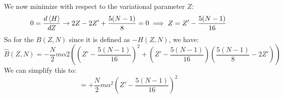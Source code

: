 \documentclass{article}[16pt]
\begin{document}
We now minimize with respect to the variational parameter $Z$:
\begin{equation}
    0 = \frac{d\expval{H}}{dZ}\rightarrow 2Z - 2Z' + \frac{5(N-1)}{8} = 0 \implies Z = Z' - \frac{5(N-1)}{16}
\end{equation}
So for the $B(Z,N)$ since it is defined as $-H(Z,N)$, we have:
\begin{equation}
    \hat{B}(Z,N) = -\frac{N}{2}m\alpha 2 \left(\left(Z' - \frac{5(N-1)}{16}\right)^2 + \left(Z' - \frac{5(N-1)}{16}\right)\left(\frac{5(N-1)}{8}-2Z'\right)\right)
\end{equation}
We can simplify this to:
\begin{equation}
    =\boxed{+\frac{N}{2}m\alpha ^{2}\left(Z' - \frac{5(N-1)}{16}\right)^{2}}
\end{equation}
\end{document}
